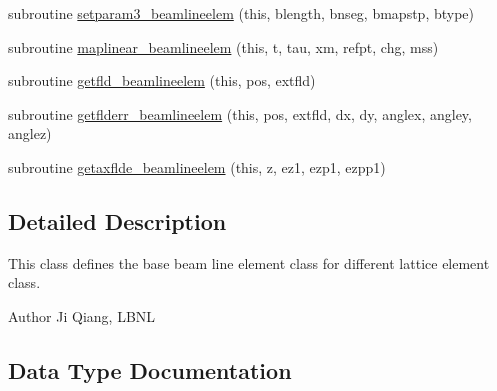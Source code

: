 \begin{DoxyCompactItemize}
\item 
subroutine \mbox{\hyperlink{namespacebeamlineelemclass_a604cc75bca5926a1918df8c19454e41e}{setparam3\+\_\+beamlineelem}} (this, blength, bnseg, bmapstp, btype)
\item 
subroutine \mbox{\hyperlink{namespacebeamlineelemclass_a76cac49c6e8615751de8c9f8bbba2641}{maplinear\+\_\+beamlineelem}} (this, t, tau, xm, refpt, chg, mss)
\item 
subroutine \mbox{\hyperlink{namespacebeamlineelemclass_a21fd373bab34a4c18c8bcf5b00816c0c}{getfld\+\_\+beamlineelem}} (this, pos, extfld)
\item 
subroutine \mbox{\hyperlink{namespacebeamlineelemclass_aa711cecfd3c01152cb0d88d88b645c4b}{getflderr\+\_\+beamlineelem}} (this, pos, extfld, dx, dy, anglex, angley, anglez)
\item 
subroutine \mbox{\hyperlink{namespacebeamlineelemclass_aa38d23f41bd5b34e31e784e1bb1b4ba2}{getaxflde\+\_\+beamlineelem}} (this, z, ez1, ezp1, ezpp1)
\end{DoxyCompactItemize}


\subsection{Detailed Description}
This class defines the base beam line element class for different lattice element class. 

\begin{DoxyAuthor}{Author}
Ji Qiang, L\+B\+NL 
\end{DoxyAuthor}


\subsection{Data Type Documentation}
\label{structbeamlineelemclass_1_1beamlineelem}
